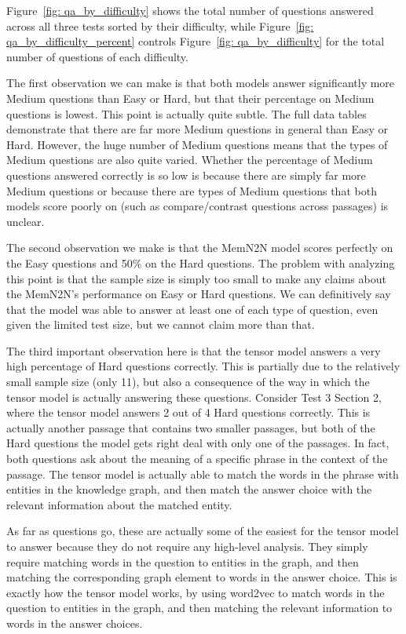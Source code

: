 \documentclass[pageno]{jpaper}
\begin{document}
Figure~\ref{fig: qa_by_difficulty} shows the total number of questions answered
across all three tests sorted by their difficulty, while Figure~\ref{fig:
qa_by_difficulty_percent} controls Figure~\ref{fig: qa_by_difficulty} for the
total number of questions of each difficulty.

The first observation we can make is that both models answer significantly more
Medium questions than Easy or Hard, but that their percentage on Medium
questions is lowest. This point is actually quite subtle. The full data tables
demonstrate that there are far more Medium questions in general than Easy or
Hard. However, the huge number of Medium questions means that the types of
Medium questions are also quite varied. Whether the percentage of Medium
questions answered correctly is so low is because there are simply far more
Medium questions or because there are types of Medium questions that both models
score poorly on (such as compare/contrast questions across passages) is unclear.

The second observation we make is that the MemN2N model scores perfectly on the
Easy questions and 50\% on the Hard questions. The problem with analyzing this
point is that the sample size is simply too small to make any claims about the
MemN2N's performance on Easy or Hard questions. We can definitively say that
the model was able to answer at least one of each type of question, even given
the limited test size, but we cannot claim more than that.

The third important observation here is that the tensor model answers a very
high percentage of Hard questions correctly. This is partially due to the
relatively small sample size (only 11), but also a consequence of the way in
which the tensor model is actually answering these questions. Consider Test 3
Section 2, where the tensor model answers 2 out of 4 Hard questions correctly.
This is actually another passage that contains two smaller passages, but both of
the Hard questions the model gets right deal with only one of the passages. In
fact, both questions ask about the meaning of a specific phrase in the context
of the passage. The tensor model is actually able to match the words in the
phrase with entities in the knowledge graph, and then match the answer choice
with the relevant information about the matched entity.

As far as questions go, these are actually some of the easiest for the tensor
model to answer because they do not require any high-level analysis. They simply
require matching words in the question to entities in the graph, and then
matching the corresponding graph element to words in the answer choice. This
is exactly how the tensor model works, by using word2vec to match words in the
question to entities in the graph, and then matching the relevant information to
words in the answer choices.
\end{document}
